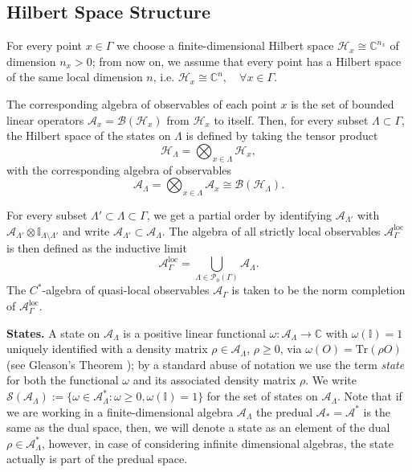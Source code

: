 \documentclass[11pt]{article}
\numberwithin{equation}{section}
\numberwithin{figure}{section}
\numberwithin{table}{section}
\theoremstyle{definition}
\theoremstyle{plain}
\theoremstyle{remark}
\newcommand{\w}{\omega}
\newcommand{\CC}{\mathbb{C}}
\newcommand{\Hil}{\mathcal{H}}
\newcommand{\Id}{\mathbb{I}}
\newcommand{\A}{\mathcal{A}}
\newcommand{\La}{\Lambda}
\newcommand{\G}{\Gamma}
\begin{document}
\subsection{Hilbert Space Structure}\label{sec:hilbertSpaceStructure}

 For every point $x\in\Gamma$ we choose a finite-dimensional Hilbert space $\Hil_x\cong \CC^{n_x}$ of dimension $n_x>0$; from now on, we assume that every point has a Hilbert space of the same local dimension $n$, i.e. $\Hil_x\cong \CC^n,\quad \forall x\in\Gamma$. 
 
 The corresponding algebra of observables of each point $x$ is the set of bounded linear operators $\A_x =\mathcal{B}(\Hil_x)$ from $\Hil_x$ to itself. Then, for every subset $\Lambda\subset \Gamma$, the Hilbert space of the states on $\Lambda$ is defined by taking the tensor product\[\Hil_\La=\bigotimes_{x\in\La}\Hil_x,\]with the corresponding algebra of observables\[\A_\La=\bigotimes_{x\in\La}\A_x\cong \mathcal{B}(\Hil_\La).\]

For every subset $\Lambda'\subset\La\subset\G$, we get a partial order by identifying $\A_{\La'}$ with $\A_{\La'}\otimes\Id_{\La \setminus\La'}$ and write $\A_{\La'}\subset \A_{\La}$. The algebra of all strictly local observables $\A_\G^{\text{loc}}$ is then defined as the inductive limit
\begin{equation}
\A_\G^{\text{loc}}=\bigcup_{\La\in\mathcal{P}_0(\G)}\A_\La.
\end{equation}
The $C^*$-algebra of quasi-local observables $\A_\G$ is taken to be the norm completion of $\A_\G^{\text{loc}}$.

\medskip

\noindent\textbf{States.} A state on $\mathcal{A}_\Lambda$ is a positive 
linear functional $\omega: \mathcal{A}_\Lambda \to \mathbb{C}$ with 
$\omega(\Id) = 1$ uniquely identified with a density matrix $\rho \in \mathcal{A}_\Lambda$, $\rho \geq 0$, via $\omega(O) = \mathrm{Tr}(\rho O)$ (see Gleason's Theorem \cite{gleason});
by a standard abuse of notation we use the term \emph{state} for both the functional $\omega$ and its associated density matrix $\rho$. We write $\mathcal{S}(\mathcal{A}_\Lambda):=\{\w\in \A_\La^*:\w \geq 0, \w(\Id)=1\}$ for the set of states on $\mathcal{A}_\Lambda$. Note that if we are working in a finite-dimensional algebra $\A_\La$ the predual $\A_*=\A^*$ is the same as the dual space, then, we will denote a state as an element of the dual $\rho\in\A_\La^*$, however, in case of considering infinite dimensional algebras, the state actually is part of the predual space.
\end{document}
